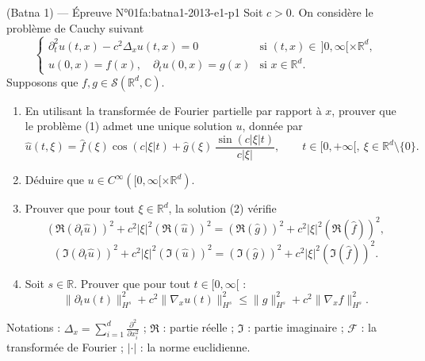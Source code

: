 \begin{problem}{(Batna 1) — Épreuve N°01}{fa:batna1-2013-e1-p1}
Soit $c>0$. On considère le problème de Cauchy suivant
$$\begin{cases}\partial_t^2u(t,x)-c^2\Delta_xu(t,x)=0 & \text{si } (t,x)\in\,]0,\infty[\times\mathbb{R}^d,\\ u(0,x)=f(x),\quad\partial_tu(0,x)=g(x) & \text{si } x\in\mathbb{R}^d.\end{cases}\tag{1}$$
Supposons que $f,g\in\mathcal{S}(\mathbb{R}^d,\mathbb{C})$.
\begin{enumerate}\item En utilisant la transformée de Fourier partielle par rapport à $x$, prouver que le problème (1) admet une unique solution $u$, donnée par
$$\hat{u}(t,\xi)=\hat{f}(\xi)\cos(c|\xi|t)+\hat{g}(\xi)\,\frac{\sin(c|\xi|t)}{c|\xi|},\qquad t\in[0,+\infty[,\ \xi\in\mathbb{R}^d\setminus\{0\}.\tag{2}$$
\item Déduire que $u\in C^\infty([0,\infty[\times\mathbb{R}^d)$.\item Prouver que pour tout $\xi\in\mathbb{R}^d$, la solution (2) vérifie
$$(\Re(\partial_t\hat{u}))^2+c^2|\xi|^2(\Re(\hat{u}))^2=(\Re(\hat{g}))^2+c^2|\xi|^2(\Re(\hat{f}))^2,$$
$$(\Im(\partial_t\hat{u}))^2+c^2|\xi|^2(\Im(\hat{u}))^2=(\Im(\hat{g}))^2+c^2|\xi|^2(\Im(\hat{f}))^2.$$
\item Soit $s\in\mathbb{R}$. Prouver que pour tout $t\in[0,\infty[$ :
$$\|\partial_tu(t)\|_{H^s}^2+c^2\|\nabla_xu(t)\|_{H^s}^2\leq\|g\|_{H^s}^2+c^2\|\nabla_xf\|_{H^s}^2.$$\end{enumerate}
Notations : $\Delta_x=\sum_{i=1}^{d}\frac{\partial^2}{\partial x_i^2}$ ; $\Re$ : partie réelle ; $\Im$ : partie imaginaire ; $\mathcal{F}$ : la transformée de Fourier ; $|\cdot|$ : la norme euclidienne.
\end{problem}
\newpage
